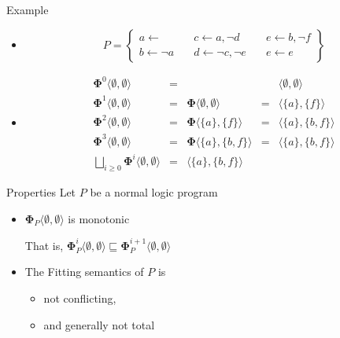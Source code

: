 \begin{frame}{Example}
  \begin{itemize}
  \item<1-> []
    \[
    P
    =
    \left\{
      \begin{array}{lll}
        a \leftarrow                  \quad &
        c \leftarrow a, \neg d       \quad &
        e \leftarrow b, \neg f
        \\
        b \leftarrow \neg a          \quad &
        d \leftarrow \neg c, \neg e \quad &
        e \leftarrow e
      \end{array}
    \right\}
    \]

  \item<2-> []
    \[
    \begin{array}{rclcl}
      \mathbf{\Phi}^0\langle\emptyset,\emptyset\rangle&=&                                              & &\langle\emptyset,\emptyset\rangle
      \\
      \mathbf{\Phi}^1\langle\emptyset,\emptyset\rangle&=&\mathbf{\Phi}\langle\emptyset,\emptyset\rangle&=&\langle\{a\}    ,\{f\}    \rangle
      \\
      \mathbf{\Phi}^2\langle\emptyset,\emptyset\rangle&=&\mathbf{\Phi}\langle\{a\}    ,\{f\}    \rangle&=&\langle\{a\}    ,\{b,f\}  \rangle
      \\
      \mathbf{\Phi}^3\langle\emptyset,\emptyset\rangle&=&\mathbf{\Phi}\langle\{a\}    ,\{b,f\}  \rangle&=&\langle\{a\}    ,\{b,f\}  \rangle%
      \\[10pt]
      \bigsqcup_{i \geq 0}\mathbf{\Phi}^i\langle\emptyset,\emptyset\rangle&=&\langle \{a\}, \{b,f\} \rangle
    \end{array}
    \]
  \end{itemize}
\end{frame}
\begin{frame}{Properties}
  \bigskip
  Let $P$ be a normal logic program
  \medskip
  \begin{itemize}
  \item ${\mathbf{\Phi}}_P\langle \emptyset, \emptyset \rangle$ is monotonic

    That is,
    \(
    {\mathbf{\Phi}}_P^i\langle \emptyset, \emptyset \rangle
    \sqsubseteq
    {\mathbf{\Phi}}_P^{i+1}\langle \emptyset, \emptyset \rangle
    \)
    \smallskip
  \item The Fitting semantics of $P$ is
    \begin{itemize}
    \item not conflicting,
    \item and generally not total
    \end{itemize}
  \end{itemize}
\end{frame}
